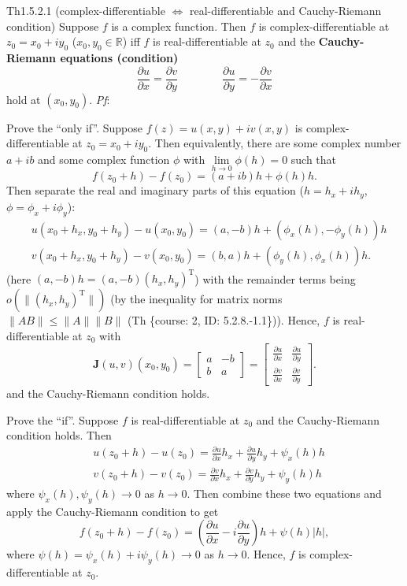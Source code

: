 \documentclass{article}
\newcommand{\parfrac}[2]{\frac{\partial #1}{\partial #2}}
\begin{document}
\begin{Th}{Th1.5.2.1 (complex-differentiable $\Leftrightarrow$ real-differentiable and Cauchy-Riemann condition)}
    Suppose $f$ is a complex function. Then $f$ is complex-differentiable at $z_0 = x_0+iy_0$ ($x_0, y_0\in\mathbb{R}$) iff $f$ is real-differentiable at $z_0$ and the \textcolor{Df}{\textbf{Cauchy-Riemann equations (condition)} 
    $$ \parfrac{u}{x} = \parfrac{v}{y} \qquad \qquad \parfrac{u}{y} = -\parfrac{v}{x} $$}
    hold at $(x_0, y_0)$.
    \tcblower
    \textit{Pf}: 
    \begin{compactenum}
        \item Prove the ``only if''. Suppose $f(z) = u(x, y) + iv(x, y)$ is complex-differentiable at $z_0 = x_0+iy_0$. Then equivalently, there are some complex number $a+ib$ and some complex function $\phi$ with $\lim\limits_{h\to 0} \phi(h) = 0$ such that
        $$ f(z_0+h) - f(z_0) = (a+ib)h + \phi(h)h. $$
        Then separate the real and imaginary parts of this equation ($h = h_x+ih_y$, $\phi = \phi_x + i\phi_y$):
        $$ \begin{aligned}
            & u(x_0+h_x, y_0+h_y) - u(x_0, y_0) = (a, -b)h + (\phi_x(h), -\phi_y(h))h\\
            & v(x_0+h_x, y_0+h_y) - v(x_0, y_0) = (b, a)h + (\phi_y(h), \phi_x(h))h.
        \end{aligned} $$
        (here $(a, -b)h = (a, -b)(h_x, h_y)^\mathrm{T}$) with the remainder terms being $o(\|(h_x, h_y)^\mathrm{T}\|)$ (by the inequality for matrix norms $\|AB\|\leq \|A\|\|B\|$ (Th \{course: 2, ID: 5.2.8.-1.1\})). Hence, $f$ is real-differentiable at $z_0$ with
        $$ \pmb{J}(u,v)(x_0, y_0) = \begin{bmatrix}
            a & -b\\
            b & a
        \end{bmatrix} = \begin{bmatrix}
            \parfrac{u}{x} & \parfrac{u}{y}\\
            \parfrac{v}{x} & \parfrac{v}{y}
        \end{bmatrix}. $$
        and the Cauchy-Riemann condition holds.
        \item Prove the ``if''. Suppose $f$ is real-differentiable at $z_0$ and the Cauchy-Riemann condition holds. Then
        $$ \begin{aligned}
            & u(z_0+h) - u(z_0) = \parfrac{u}{x}h_x + \parfrac{u}{y}h_y + \psi_x(h)h \\
            & v(z_0+h) - v(z_0) = \parfrac{v}{x}h_x + \parfrac{v}{y}h_y + \psi_y(h)h
        \end{aligned} $$
        where $\psi_x(h), \psi_y(h)\to 0$ as $h\to 0$. Then combine these two equations and apply the Cauchy-Riemann condition to get
        $$ f(z_0+h)-f(z_0)=\left(\frac{\partial u}{\partial x}-i\frac{\partial u}{\partial y}\right)h+\psi(h)|h|, $$
        where $\psi(h) = \psi_x(h) + i\psi_y(h) \to 0$ as $h\to 0$. Hence, $f$ is complex-differentiable at $z_0$.
    \end{compactenum}
\end{Th}
\end{document}
